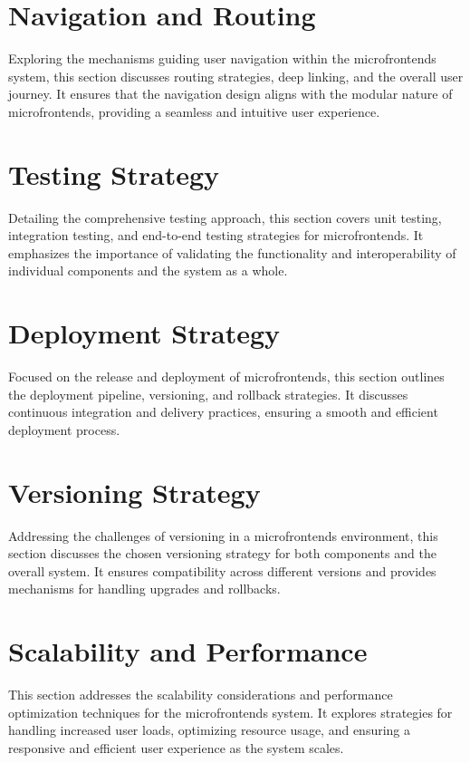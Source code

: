 \section{Navigation and Routing}
Exploring the mechanisms guiding user navigation within the microfrontends system, this section discusses routing strategies, deep linking, and the overall user journey. It ensures that the navigation design aligns with the modular nature of microfrontends, providing a seamless and intuitive user experience.

\section{Testing Strategy}
Detailing the comprehensive testing approach, this section covers unit testing, integration testing, and end-to-end testing strategies for microfrontends. It emphasizes the importance of validating the functionality and interoperability of individual components and the system as a whole.

\section{Deployment Strategy}
Focused on the release and deployment of microfrontends, this section outlines the deployment pipeline, versioning, and rollback strategies. It discusses continuous integration and delivery practices, ensuring a smooth and efficient deployment process.

\section{Versioning Strategy}
Addressing the challenges of versioning in a microfrontends environment, this section discusses the chosen versioning strategy for both components and the overall system. It ensures compatibility across different versions and provides mechanisms for handling upgrades and rollbacks.

\section{Scalability and Performance}
This section addresses the scalability considerations and performance optimization techniques for the microfrontends system. It explores strategies for handling increased user loads, optimizing resource usage, and ensuring a responsive and efficient user experience as the system scales.